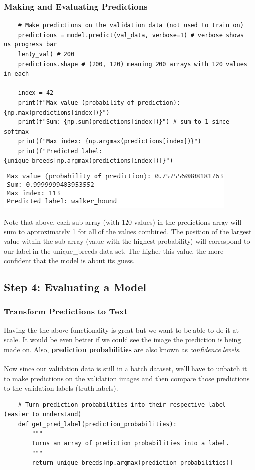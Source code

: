 \documentclass[11pt, a4paper]{article}
\begin{document}
\begin{spacing}{1.1}
	\subsubsection{Making and Evaluating Predictions}
	\begin{lstlisting}
	# Make predictions on the validation data (not used to train on)
	predictions = model.predict(val_data, verbose=1) # verbose shows us progress bar
	len(y_val) # 200
	predictions.shape # (200, 120) meaning 200 arrays with 120 values in each
	
	index = 42 
	print(f"Max value (probability of prediction): {np.max(predictions[index])}")
	print(f"Sum: {np.sum(predictions[index])}") # sum to 1 since softmax
	print(f"Max index: {np.argmax(predictions[index])}")
	print(f"Predicted label: {unique_breeds[np.argmax(predictions[index])]}") \end{lstlisting} \vspace*{1mm}
	\includegraphics[scale=.8]{first_pred} \newpage

	\noindent Note that above, each sub-array (with 120 values) in the predictions array will sum to approximately 1 for all of the values combined. The position of the largest value within the sub-array (value with the highest probability) will correspond to our label in the unique\_breeds data set. The higher this value, the more confident that the model is about its guess. \vspace*{2mm}
	\subsection{Step 4: Evaluating a Model}
	\subsubsection{Transform Predictions to Text}
	Having the the above functionality is great but we want to be able to do it at scale. It would be even better if we could see the image the prediction is being made on. Also, \textbf{prediction probabilities} are also known as \textit{confidence levels}. \\~\\
	Now since our validation data is still in a batch dataset, we'll have to \href{https://www.tensorflow.org/api_docs/python/tf/data/Dataset#unbatch}{unbatch} it to make predictions on the validation images and then compare those predictions to the validation labels (truth labels).
	\begin{lstlisting}
	# Turn prediction probabilities into their respective label (easier to understand)
	def get_pred_label(prediction_probabilities):
		"""
		Turns an array of prediction probabilities into a label.
		"""
		return unique_breeds[np.argmax(prediction_probabilities)]
	

\end{lstlisting}
\end{spacing}
\end{document}
